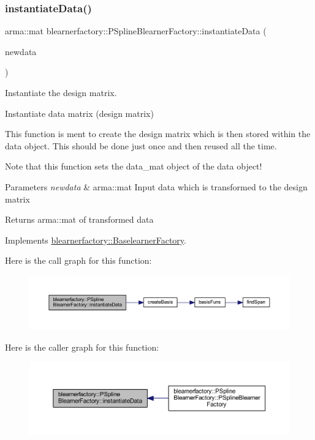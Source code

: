 \subsubsection{\texorpdfstring{instantiate\+Data()}{instantiateData()}}
{\footnotesize\ttfamily arma\+::mat blearnerfactory\+::\+P\+Spline\+Blearner\+Factory\+::instantiate\+Data (\begin{DoxyParamCaption}\item[{const arma\+::mat \&}]{newdata }\end{DoxyParamCaption})\hspace{0.3cm}{\ttfamily [virtual]}}



Instantiate the design matrix. 

Instantiate data matrix (design matrix)

This function is ment to create the design matrix which is then stored within the data object. This should be done just once and then reused all the time.

Note that this function sets the {\ttfamily data\+\_\+mat} object of the data object!


\begin{DoxyParams}{Parameters}
{\em newdata} & {\ttfamily arma\+::mat} Input data which is transformed to the design matrix\\
\hline
\end{DoxyParams}
\begin{DoxyReturn}{Returns}
{\ttfamily arma\+::mat} of transformed data 
\end{DoxyReturn}


Implements \hyperlink{classblearnerfactory_1_1_baselearner_factory_ac4a38c4815fb33b8d4785745117c5e57}{blearnerfactory\+::\+Baselearner\+Factory}.

Here is the call graph for this function\+:\nopagebreak
\begin{figure}[H]
\begin{center}
\leavevmode
\includegraphics[width=350pt]{classblearnerfactory_1_1_p_spline_blearner_factory_a290a1c60224d027059939a895b474aa1_cgraph}
\end{center}
\end{figure}
Here is the caller graph for this function\+:\nopagebreak
\begin{figure}[H]
\begin{center}
\leavevmode
\includegraphics[width=350pt]{classblearnerfactory_1_1_p_spline_blearner_factory_a290a1c60224d027059939a895b474aa1_icgraph}
\end{center}
\end{figure}


